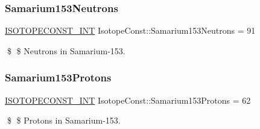 \subsubsection{\texorpdfstring{Samarium153\+Neutrons}{Samarium153Neutrons}}
{\footnotesize\ttfamily \mbox{\hyperlink{group___isotope_const-_macros_ga5f18360b3e99483a35c32d789e62621c}{I\+S\+O\+T\+O\+P\+E\+C\+O\+N\+S\+T\+\_\+\+I\+NT}} Isotope\+Const\+::\+Samarium153\+Neutrons = 91}

\$ \$ Neutrons in Samarium-\/153. \mbox{\label{group___isotope_const-_samarium-_sm153_gab1f1abed33a2de23081cc414ce25cce4}} 
\subsubsection{\texorpdfstring{Samarium153\+Protons}{Samarium153Protons}}
{\footnotesize\ttfamily \mbox{\hyperlink{group___isotope_const-_macros_ga5f18360b3e99483a35c32d789e62621c}{I\+S\+O\+T\+O\+P\+E\+C\+O\+N\+S\+T\+\_\+\+I\+NT}} Isotope\+Const\+::\+Samarium153\+Protons = 62}

\$ \$ Protons in Samarium-\/153. 